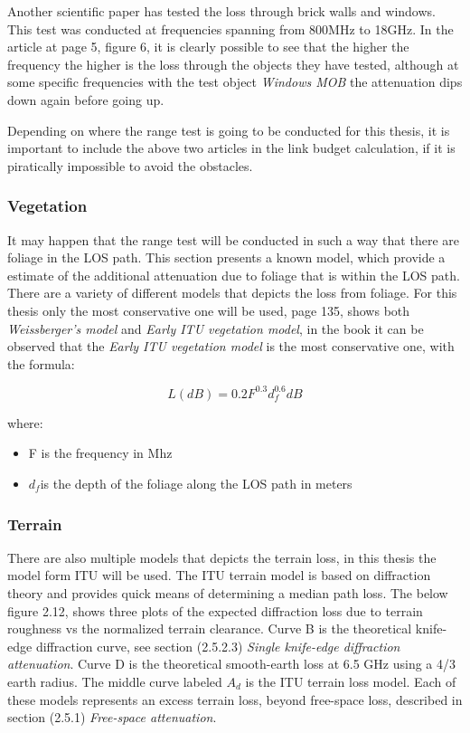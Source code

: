 Another scientific paper has tested the loss through brick walls and windows\cite{ModernBuildings}. This test was conducted at frequencies spanning from 800MHz to 18GHz. In the article at page 5, figure 6, it is clearly possible to see that the higher the frequency the higher is the loss through the objects they have tested, although at some specific frequencies with the test object \textit{Windows MOB} the attenuation dips down again before going up. 

Depending on where the range test is going to be conducted for this thesis, it is important to include the above two articles in the link budget calculation, if it is piratically impossible to avoid the obstacles. 

\subsubsection{Vegetation}
It may happen that the range test will be conducted in such a way that there are foliage in the LOS path. This section presents a known model, which provide a estimate of the additional attenuation due to foliage that is within the LOS path. There are a variety of different models that depicts the loss from foliage. For this thesis only the most conservative one will be used, \cite{RFpropagation} page 135, shows both \textit{Weissberger's model} and \textit{Early ITU vegetation model}, in the book it can be observed that the \textit{Early ITU vegetation model} is the most conservative one, with the formula:

\begin{equation}
    L(dB) = 0.2F^{0.3}d_f^{0.6} dB
\end{equation}

where:

\begin{itemize}
  \item F is the frequency in Mhz
  \item $d_f$is the depth of the foliage along the LOS path in meters
\end{itemize}

\subsubsection{Terrain}
There are also multiple models that depicts the terrain loss, in this thesis the model form ITU will be used. The ITU terrain model is based on diffraction theory and provides quick means of determining a median path loss. The below figure 2.12, shows three plots of the expected diffraction loss due to terrain roughness vs the normalized terrain clearance. Curve B is the theoretical knife-edge diffraction curve, see section (2.5.2.3) \textit{Single knife-edge diffraction attenuation}. Curve D is the theoretical smooth-earth loss at 6.5 GHz using a 4/3 earth radius. The middle curve labeled $A_d$ is the ITU terrain loss model. Each of these models represents an excess terrain loss, beyond free-space loss, described in section (2.5.1) \textit{Free-space attenuation}. 

